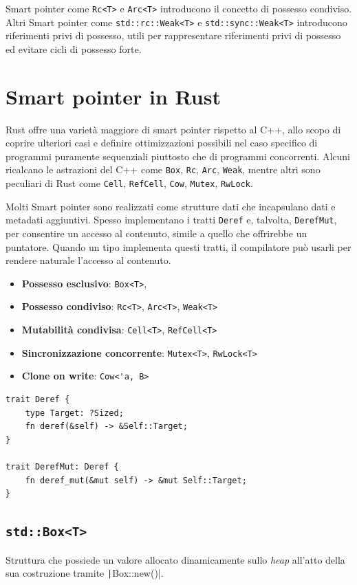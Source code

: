 Smart pointer come \verb|Rc<T>| e \verb|Arc<T>| introducono il concetto di
possesso condiviso. Altri Smart pointer come \verb|std::rc::Weak<T>| e \verb|std::sync::Weak<T>|
introducono riferimenti privi di possesso, utili per rappresentare riferimenti
privi di possesso ed evitare cicli di possesso forte.

\section{Smart pointer in Rust}
Rust offre una varietà maggiore di smart pointer rispetto al C++, allo scopo di
coprire ulteriori casi e definire ottimizzazioni possibili nel caso specifico di
programmi puramente sequenziali piuttosto che di programmi concorrenti. Alcuni
ricalcano le astrazioni del C++ come \verb|Box|, \verb|Rc|, \verb|Arc|,
\verb|Weak|, mentre altri sono peculiari di Rust come \verb|Cell|,
\verb|RefCell|, \verb|Cow|, \verb|Mutex|, \verb|RwLock|.

Molti Smart pointer sono realizzati come strutture dati che incapsulano dati e
metadati aggiuntivi. Spesso implementano i tratti \verb|Deref| e, talvolta,
\verb|DerefMut|, per consentire un accesso al contenuto, simile a quello che
offrirebbe un puntatore. Quando un tipo implementa questi tratti, il
compilatore può usarli per rendere naturale l'accesso al contenuto.

\begin{itemize}
  \setlength{\itemsep}{1pt}
  \item \textbf{Possesso esclusivo}: \verb|Box<T>|,
  \item \textbf{Possesso condiviso}: \verb|Rc<T>|, \verb|Arc<T>|, \verb|Weak<T>|
  \item \textbf{Mutabilità condivisa}: \verb|Cell<T>|, \verb|RefCell<T>|
  \item \textbf{Sincronizzazione concorrente}: \verb|Mutex<T>|, \verb|RwLock<T>|
  \item \textbf{Clone on write}: \verb|Cow<'a, B>|
\end{itemize}

\begin{verbatim}
trait Deref {
    type Target: ?Sized;
    fn deref(&self) -> &Self::Target;
}

trait DerefMut: Deref {
    fn deref_mut(&mut self) -> &mut Self::Target;
}
\end{verbatim}

\subsection{\texttt{std::Box<T>}}
Struttura che possiede un valore allocato dinamicamente sullo \textit{heap}
all'atto della sua costruzione tramite \texttt|Box::new()|.

